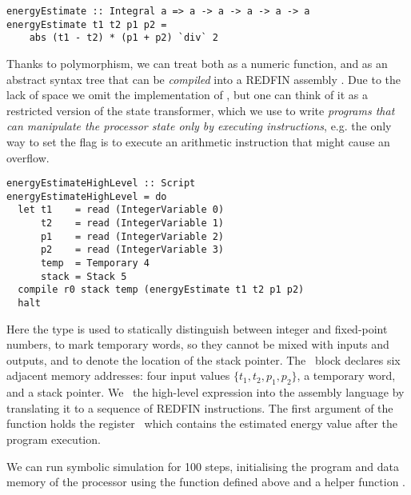 
\begin{verbatim}
energyEstimate :: Integral a => a -> a -> a -> a -> a
energyEstimate t1 t2 p1 p2 =
    abs (t1 - t2) * (p1 + p2) `div` 2
\end{verbatim}

\noindent
Thanks to polymorphism, we can treat  both as a numeric
function, and as an abstract syntax tree that can be \emph{compiled} into a
REDFIN assembly . Due to the lack of space we omit the implementation
of , but one can think of it as a restricted version
of the  state transformer, which we use to write \emph{programs that
can manipulate the processor state only by executing instructions}, e.g. the
only way to set the  flag is to execute an arithmetic instruction
that might cause an overflow.

\begin{verbatim}
energyEstimateHighLevel :: Script
energyEstimateHighLevel = do
  let t1    = read (IntegerVariable 0)
      t2    = read (IntegerVariable 1)
      p1    = read (IntegerVariable 2)
      p2    = read (IntegerVariable 3)
      temp  = Temporary 4
      stack = Stack 5
  compile r0 stack temp (energyEstimate t1 t2 p1 p2)
  halt
\end{verbatim}
\label{energyEstimateHighLevel}

\noindent
Here the type  is used to statically distinguish between integer
and fixed-point numbers,  to mark temporary words, so they cannot
be mixed with inputs and outputs, and  to denote the location of the
stack pointer. The~ block declares six adjacent memory addresses: four
input values $\{t_1, t_2, p_1, p_2\}$, a temporary word, and a stack pointer.
We~ the high-level expression  into the assembly
language by translating it to a sequence of REDFIN instructions. The first
argument of the~ function holds the register~ which contains
the estimated energy value after the program execution.

We can run symbolic simulation for 100 steps, initialising the program and data
memory of the processor using the function  defined above and a
helper function .

